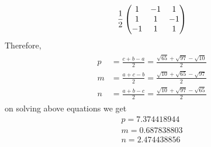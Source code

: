\documentclass[10pt]{book}
\begin{document}
\begin{enumerate}[label=\thesection.\arabic*.,ref=\thesection.\theenumi]
\begin{align}
			\frac{1}{2}\begin{pmatrix}1 & -1 & 1\\ 1 & 1 & -1\\ -1 & 1 & 1\end{pmatrix}
	\end{align}
	Therefore,
\begin{align}
\begin{split}
    p&=\frac{c+b-a}{2}
    =\frac{\sqrt{65}+\sqrt{97}-\sqrt{10}}{2}
    \\
    m&=\frac{a+c-b}{2}
    =\frac{\sqrt{10}+\sqrt{65}-\sqrt{97}}{2}
    \\
    n&=\frac{a+b-c}{2}
    =\frac{\sqrt{10}+\sqrt{97}-\sqrt{65}}{2}
\end{split}
\label{eq:incircle-mnp}
\end{align}
on solving above equations we get
\begin{align}
    p= 7.374418944\\
    m= 0.687838803\\
    n=2.474438856
\end{align}
 

\end{enumerate}
\end{document}
